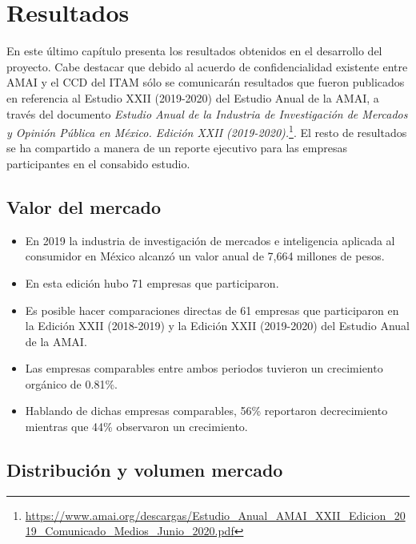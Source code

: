 \chapter{Resultados}

\noindent En este último capítulo presenta los resultados obtenidos en el desarrollo del proyecto. Cabe destacar que debido al acuerdo de confidencialidad existente entre AMAI y el CCD del ITAM sólo se comunicarán resultados que fueron publicados en referencia al Estudio XXII (2019-2020) del Estudio Anual de la AMAI, a través del documento \emph{Estudio Anual de la Industria de Investigación de Mercados y Opinión Pública en México. Edición XXII (2019-2020).}\footnote{\url{https://www.amai.org/descargas/Estudio_Anual_AMAI_XXII_Edicion_2019_Comunicado_Medios_Junio_2020.pdf}}. El resto de resultados se ha compartido a manera de un reporte ejecutivo para las empresas participantes en el consabido estudio.

\section{Valor del mercado}

\begin{itemize}
    \item En 2019 la industria de investigación de mercados e inteligencia aplicada al consumidor en México alcanzó un valor anual de 7,664 millones de pesos.
    \item En esta edición hubo 71 empresas que participaron.
    \item Es posible hacer comparaciones directas de 61 empresas que participaron en la Edición XXII (2018-2019) y la Edición XXII (2019-2020) del Estudio Anual de la AMAI.
    \item Las empresas comparables entre ambos periodos tuvieron un crecimiento orgánico de 0.81\%.
    \item Hablando de dichas empresas comparables, 56\% reportaron decrecimiento mientras que 44\% observaron un crecimiento.
\end{itemize}

\section{Distribución y volumen mercado}

